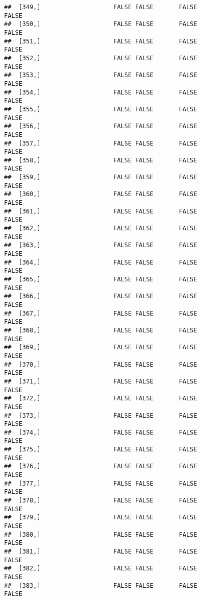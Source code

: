 \documentclass[
]{article}
\begin{document}
\begin{verbatim}
##  [349,]                    FALSE FALSE       FALSE                FALSE
##  [350,]                    FALSE FALSE       FALSE                FALSE
##  [351,]                    FALSE FALSE       FALSE                FALSE
##  [352,]                    FALSE FALSE       FALSE                FALSE
##  [353,]                    FALSE FALSE       FALSE                FALSE
##  [354,]                    FALSE FALSE       FALSE                FALSE
##  [355,]                    FALSE FALSE       FALSE                FALSE
##  [356,]                    FALSE FALSE       FALSE                FALSE
##  [357,]                    FALSE FALSE       FALSE                FALSE
##  [358,]                    FALSE FALSE       FALSE                FALSE
##  [359,]                    FALSE FALSE       FALSE                FALSE
##  [360,]                    FALSE FALSE       FALSE                FALSE
##  [361,]                    FALSE FALSE       FALSE                FALSE
##  [362,]                    FALSE FALSE       FALSE                FALSE
##  [363,]                    FALSE FALSE       FALSE                FALSE
##  [364,]                    FALSE FALSE       FALSE                FALSE
##  [365,]                    FALSE FALSE       FALSE                FALSE
##  [366,]                    FALSE FALSE       FALSE                FALSE
##  [367,]                    FALSE FALSE       FALSE                FALSE
##  [368,]                    FALSE FALSE       FALSE                FALSE
##  [369,]                    FALSE FALSE       FALSE                FALSE
##  [370,]                    FALSE FALSE       FALSE                FALSE
##  [371,]                    FALSE FALSE       FALSE                FALSE
##  [372,]                    FALSE FALSE       FALSE                FALSE
##  [373,]                    FALSE FALSE       FALSE                FALSE
##  [374,]                    FALSE FALSE       FALSE                FALSE
##  [375,]                    FALSE FALSE       FALSE                FALSE
##  [376,]                    FALSE FALSE       FALSE                FALSE
##  [377,]                    FALSE FALSE       FALSE                FALSE
##  [378,]                    FALSE FALSE       FALSE                FALSE
##  [379,]                    FALSE FALSE       FALSE                FALSE
##  [380,]                    FALSE FALSE       FALSE                FALSE
##  [381,]                    FALSE FALSE       FALSE                FALSE
##  [382,]                    FALSE FALSE       FALSE                FALSE
##  [383,]                    FALSE FALSE       FALSE                FALSE

\end{verbatim}
\end{document}
